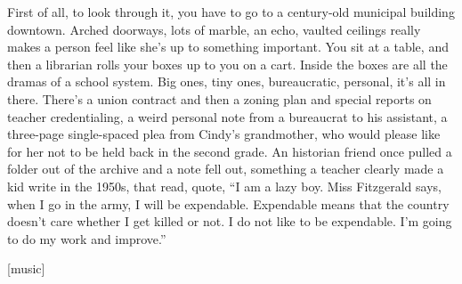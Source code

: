 First of all, to look through it, you have to go to a century-old
municipal building downtown. Arched doorways, lots of marble, an echo,
vaulted ceilings really makes a person feel like she's up to something
important. You sit at a table, and then a librarian rolls your boxes up
to you on a cart. Inside the boxes are all the dramas of a school
system. Big ones, tiny ones, bureaucratic, personal, it's all in there.
There's a union contract and then a zoning plan and special reports on
teacher credentialing, a weird personal note from a bureaucrat to his
assistant, a three-page single-spaced plea from Cindy's grandmother, who
would please like for her not to be held back in the second grade. An
historian friend once pulled a folder out of the archive and a note fell
out, something a teacher clearly made a kid write in the 1950s, that
read, quote, ``I am a lazy boy. Miss Fitzgerald says, when I go in the
army, I will be expendable. Expendable means that the country doesn't
care whether I get killed or not. I do not like to be expendable. I'm
going to do my work and improve.''

{[}music{]}

